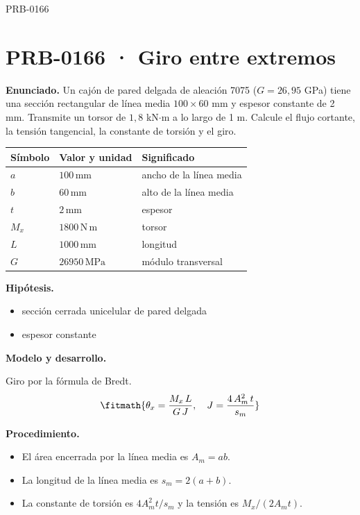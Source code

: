 \begin{studiumworked}{PRB-0166}

\section{PRB-0166 · Giro entre extremos}

\textbf{Enunciado.} Un cajón de pared delgada de aleación 7075 ($G = 26{,}95$ GPa) tiene una sección rectangular de línea media $100\times 60$ mm y espesor constante de 2 mm. Transmite un torsor de $1{,}8$ kN$\cdot$m a lo largo de 1 m. Calcule el flujo cortante, la tensión tangencial, la constante de torsión y el giro.

\par\medskip\noindent\begin{tabular}{@{}p{.18\linewidth}p{.26\linewidth}p{.48\linewidth}@{}}
\toprule Símbolo & Valor y unidad & Significado\\\midrule
$a$ & $100\,\mathrm{mm}$ & ancho de la línea media\\
$b$ & $60\,\mathrm{mm}$ & alto de la línea media\\
$t$ & $2\,\mathrm{mm}$ & espesor\\
$M_{x}$ & $1800\,\mathrm{N\,m}$ & torsor\\
$L$ & $1000\,\mathrm{mm}$ & longitud\\
$G$ & $26950\,\mathrm{MPa}$ & módulo transversal\\
\bottomrule\end{tabular}\par\medskip

\textbf{Hipótesis.}\begin{itemize}\item sección cerrada unicelular de pared delgada
\item espesor constante\end{itemize}

\textbf{Modelo y desarrollo.}

Giro por la fórmula de Bredt.\[\fitmath{\theta_x = \frac{M_x\,L}{G\,J},\quad J = \frac{4\,A_m^{2}\,t}{s_m}}\]

\textbf{Procedimiento.}\begin{itemize}\item El área encerrada por la línea media es $A_m = a b$.
\item La longitud de la línea media es $s_m = 2(a + b)$.
\item La constante de torsión es $4 A_m^2 t/s_m$ y la tensión es $M_x/(2 A_m t)$.\end{itemize}


\end{studiumworked}
